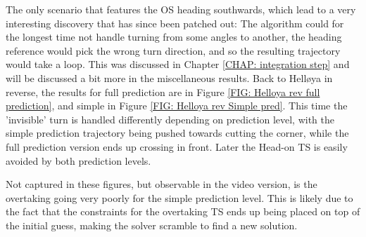 The only scenario that features the OS heading southwards, which lead to a very interesting discovery that has since been patched out: The algorithm could for the longest
time not handle turning from some angles to another, the heading reference would pick the wrong turn direction, and so the resulting trajectory would take a loop. 
This was discussed in Chapter \ref{CHAP: integration step} and will be discussed a bit more in the miscellaneous results. 
Back to Helløya in reverse, the results for full prediction are in Figure \ref{FIG: Helloya rev full prediction}, 
and simple in Figure \ref{FIG: Helloya rev Simple pred}. This time the 'invisible' turn is handled differently depending on prediction level, with
the simple prediction trajectory being pushed towards cutting the corner, while the full prediction version ends up crossing in front. Later the Head-on
TS is easily avoided by both prediction levels.

Not captured in these figures, but observable in the video version, is the 
overtaking going very poorly for the simple prediction level. This is likely due to the fact that the
constraints for the overtaking TS ends up being placed on top of the initial guess, making the solver scramble to find a new solution.


